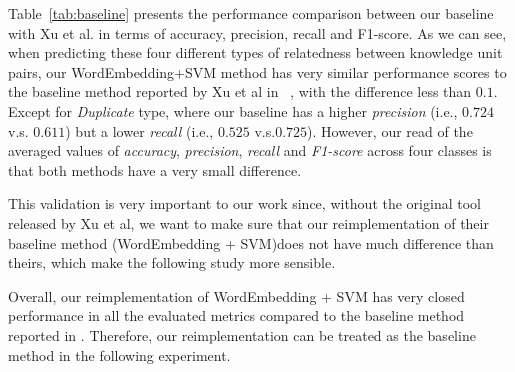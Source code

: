 \documentclass[sigconf,review, anonymous]{acmart}
\theoremstyle{break}
\newcommand{\tab}[1]{Table~\ref{tab:#1}}
\begin{document}
 \tab{baseline} presents the performance comparison between our baseline with
 Xu et al. in terms of accuracy, precision, recall and F1-score. As we can see, 
 when predicting these four different types of relatedness between knowledge unit pairs,
 our WordEmbedding+SVM method has  very  similar performance scores to the baseline method
 reported by Xu et al in ~\cite{xu2016predicting}, with the difference less than $0.1$.  
 Except for {\it Duplicate} type, where our baseline 
has a higher {\it precision} (i.e., $0.724$ v.s. $0.611$) but a lower {\it recall} (i.e., $0.525$ v.s.$0.725$).
However, our read of the averaged values of {\it accuracy}, {\it precision}, {\it recall}
and {\it F1-score} across four classes is that both methods have
a very small difference.

This validation  is  very important to our work since, without the original tool released by Xu et al,
we want to make sure that our reimplementation of their baseline method (WordEmbedding + SVM)does not have much difference
than theirs, which make the following study more sensible.

\begin{lesson}
Overall, our reimplementation of WordEmbedding + SVM
has very closed performance in all the evaluated metrics 
 compared to the baseline method reported in \cite{xu2016predicting}.
Therefore, our reimplementation can be treated as the baseline method in the following
experiment.
\end{lesson}
\end{document}
